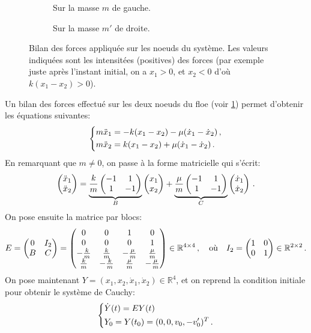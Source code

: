 \begin{figure}[!h]
    \begin{subfigure}[b]{0.33\textwidth}
        \centering
        \caption{Sur la masse $m$ de gauche.}
    \end{subfigure}
    \begin{subfigure}[b]{0.3\textwidth}
        \centering
        \caption{Sur la masse $m'$ de droite.}
    \end{subfigure}
       \caption{Bilan des forces appliquée sur les noeuds du système. Les valeurs indiquées sont les intensitées (positives) des forces (par exemple juste après l'instant initial, on a $x_1 > 0$, et $x_2 < 0$ d'où $k(x_1-x_2) > 0$).}
       \label{fig:bilan0}
\end{figure}


\noindent Un bilan des forces effectué sur les deux noeuds du floe (voir \cref{fig:bilan0}) permet d'obtenir les équations suivantes:
\begin{align}
    \begin{dcases}
    m\ddot x_1 = - k(x_1 - x_2) - \mu(\dot x_1 - \dot x_2) \,,\\
        m \ddot x_2 =  k(x_1 - x_2) + \mu(\dot x_1 - \dot x_2) \,. 
    \end{dcases}
\end{align}
En remarquant que $m\neq 0$, on passe à la forme matricielle qui s'écrit:
\begin{align}
    \begin{pmatrix} \ddot{x}_1 \\ \ddot{x}_2 \end{pmatrix} = 
      \underbrace{ \frac{k}{m} \begin{pmatrix} -1 & 1 \\ 1 & -1 \end{pmatrix}}_{B} \begin{pmatrix} x_1 \\ x_2 \end{pmatrix}
    + \underbrace{\frac{\mu}{m} \begin{pmatrix} -1 & 1 \\ 1 & -1 \end{pmatrix}}_{C} \begin{pmatrix} \dot{x}_1 \\ \dot{x}_2 \end{pmatrix} \,.
\end{align}
On pose ensuite la matrice par blocs:
\[ E = \begin{pmatrix} 0 & I_2 \\ B & C \end{pmatrix}  =  \begin{pmatrix}
    0 & 0 & 1 & 0 \\ 0 & 0& 0& 1 \\ -\frac{k}{m} & \frac{k}{m} & -\frac{\mu}{m} & \frac{\mu}{m} \\ \frac{k}{m} & -\frac{k}{m} & \frac{\mu}{m} & -\frac{\mu}{m}
\end{pmatrix}   \in \mathbb{R}^{4\times 4} \,, \quad \text{où} \quad I_2 = \begin{pmatrix} 1 & 0 \\ 0 & 1 \end{pmatrix} \in \mathbb{R}^{2\times 2} \,. \]
On pose maintenant $Y = (x_1, x_2, \dot{x}_1, \dot{x}_2) \in \mathbb{R}^4$, et on reprend la condition initiale pour obtenir le système de Cauchy:
\begin{align} \label{eq:dep1d}
    \begin{dcases}
        \dot{Y}(t)= E Y(t) \\
        Y_0 = Y(t_0) = (0,0,v_0,-v'_0)^T \,.
    \end{dcases}
\end{align}

